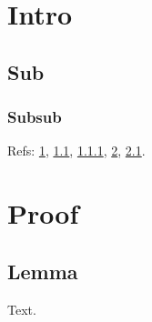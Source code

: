 \documentclass[compsoc]{IEEEtran}
\begin{document}
\section{Intro}\label{s1}
\subsection{Sub}\label{s11}
\subsubsection{Subsub}\label{s111}
Refs: \ref{s1}, \ref{s11}, \ref{s111}, \ref{a1}, \ref{a11}.
\appendices
\section{Proof}\label{a1}
\subsection{Lemma}\label{a11}
Text.
\end{document}
